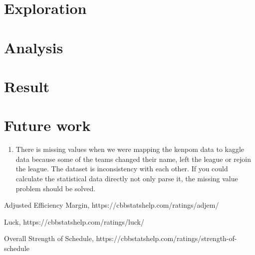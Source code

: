 \documentclass[
10pt, %
a4paper, %
oneside, %
headinclude,footinclude, %
BCOR5mm, %
]{scrartcl}
\begin{document}
\section{Exploration}


\section{Analysis}


\section{Result}


\section{Future work}
\begin{enumerate}
\item There is missing values when we were mapping the kenpom data to kaggle data because some of the teams changed their name, left the league or rejoin the league. The dataset is inconsistency with each other. If you could calculate the statistical data directly not only parse it, the missing value problem should be solved.
\end{enumerate}


\begin{thebibliography}{3}
 Adjusted Efficiency Margin, https://cbbstatshelp.com/ratings/adjem/
 
 Luck, https://cbbstatshelp.com/ratings/luck/
 
 Overall Strength of Schedule, https://cbbstatshelp.com/ratings/strength-of-schedule
\end{thebibliography}

\end{document}
